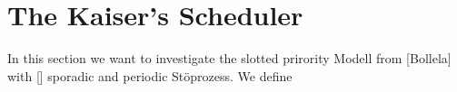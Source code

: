\section{The Kaiser's Scheduler}


In this section we want to investigate the slotted prirority Modell from [Bollela] with [] sporadic and periodic Stöprozess.
We define  	    
   
   
   
